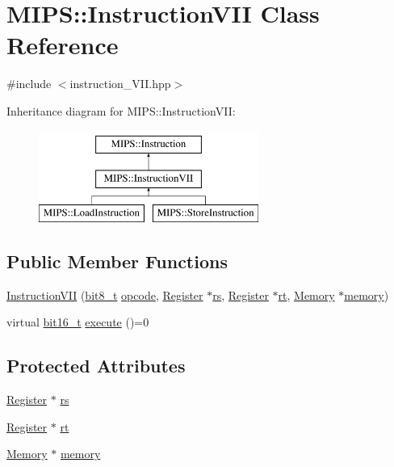 \hypertarget{classMIPS_1_1InstructionVII}{}\section{M\+I\+PS\+:\+:Instruction\+V\+II Class Reference}
\label{classMIPS_1_1InstructionVII}


{\ttfamily \#include $<$instruction\+\_\+\+V\+I\+I.\+hpp$>$}

Inheritance diagram for M\+I\+PS\+:\+:Instruction\+V\+II\+:\begin{figure}[H]
\begin{center}
\leavevmode
\includegraphics[height=3.000000cm]{classMIPS_1_1InstructionVII}
\end{center}
\end{figure}
\subsection*{Public Member Functions}
\begin{DoxyCompactItemize}
\item 
\hyperlink{classMIPS_1_1InstructionVII_a43d5166f940af6178bd179ea81df6a55}{Instruction\+V\+II} (\hyperlink{core_8hpp_a6074bae122ae7b527864eec42c728c3c}{bit8\+\_\+t} \hyperlink{classMIPS_1_1Instruction_a45cc6808b5dde8a5d41067d148b55476}{opcode}, \hyperlink{classMIPS_1_1Register}{Register} $\ast$\hyperlink{classMIPS_1_1InstructionVII_a8e51202e0b22f8e74668f6de95089e60}{rs}, \hyperlink{classMIPS_1_1Register}{Register} $\ast$\hyperlink{classMIPS_1_1InstructionVII_a8710c06b6e7816f330b0c5daea3402a4}{rt}, \hyperlink{classMIPS_1_1Memory}{Memory} $\ast$\hyperlink{classMIPS_1_1InstructionVII_a4fb34750bedbf137b43f9b55b591e0d7}{memory})
\item 
virtual \hyperlink{core_8hpp_adc265a970bc35995b5879784bbb3f1b7}{bit16\+\_\+t} \hyperlink{classMIPS_1_1InstructionVII_ab004a9cdc0efa7afacb964352abf3ee7}{execute} ()=0
\end{DoxyCompactItemize}
\subsection*{Protected Attributes}
\begin{DoxyCompactItemize}
\item 
\hyperlink{classMIPS_1_1Register}{Register} $\ast$ \hyperlink{classMIPS_1_1InstructionVII_a8e51202e0b22f8e74668f6de95089e60}{rs}
\item 
\hyperlink{classMIPS_1_1Register}{Register} $\ast$ \hyperlink{classMIPS_1_1InstructionVII_a8710c06b6e7816f330b0c5daea3402a4}{rt}
\item 
\hyperlink{classMIPS_1_1Memory}{Memory} $\ast$ \hyperlink{classMIPS_1_1InstructionVII_a4fb34750bedbf137b43f9b55b591e0d7}{memory}
\end{DoxyCompactItemize}


